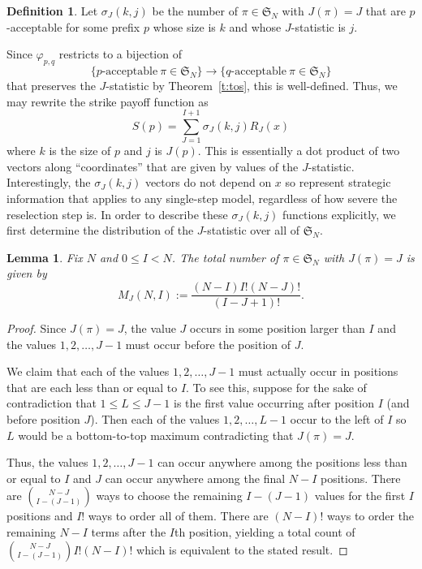 \documentclass[11pt]{amsart}   %
\newtheorem{lemma}[theorem]{Lemma}
\theoremstyle{definition}
\newtheorem{definition}[theorem]{Definition}
\theoremstyle{remark}
\numberwithin{equation}{section}
\theoremstyle{theorem}
\newcommand{\SN}{\mathfrak{S}}
\begin{document}
\begin{definition}
Let $\sigma_J(k, j)$ be the number of $\pi \in \SN_N$ with $J(\pi) = J$ that are $p$-acceptable for some prefix $p$ whose size is $k$ and whose $J$-statistic is $j$.
\end{definition}

Since $\varphi_{p,q}$ restricts to a bijection of
\[ \{p\text{-acceptable}\ \pi \in \SN_N\} \rightarrow \{q\text{-acceptable}\ \pi \in \SN_N\} \] 
that preserves the $J$-statistic by Theorem~\ref{t:tos}, this is well-defined.
Thus, we may rewrite the strike payoff function as
\[ S(p) = \sum_{J=1}^{I+1} \sigma_J(k, j) R_J(x) \]
where $k$ is the size of $p$ and $j$ is $J(p)$.  This is essentially a dot
product of two vectors along ``coordinates'' that are given by values of the
$J$-statistic.  Interestingly, the $\sigma_J(k, j)$ vectors do not depend on $x$
so represent strategic information that applies to any single-step model,
regardless of how severe the reselection step is.  In order to describe these
$\sigma_J(k, j)$ functions explicitly, we first determine the distribution of the
$J$-statistic over all of $\SN_N$.

\begin{lemma}\label{l:mj}
Fix $N$ and $0 \leq I < N$.  The total number of $\pi \in \SN_N$ with $J(\pi) = J$ is given by 
\[ M_J(N, I) := \frac{(N-I) I! (N-J)!}{(I-J+1)!}. \]
\end{lemma}
\begin{proof}
Since $J(\pi) = J$, the value $J$ occurs in some position larger than $I$ and
the values $1, 2, \ldots, J-1$ must occur before the position of $J$.  

We claim that each of the values $1, 2, \ldots, J-1$ must actually occur in
positions that are each less than or equal to $I$.  To see this, suppose for
the sake of contradiction that $1 \leq L \leq J-1$ is the first value occurring
after position $I$ (and before position $J$).  Then each of the values $1, 2,
\ldots, L-1$ occur to the left of $I$ so $L$ would be a bottom-to-top maximum
contradicting that $J(\pi) = J$.  

Thus, the values $1, 2, \ldots, J-1$ can occur anywhere among the positions
less than or equal to $I$ and $J$ can occur anywhere among the final $N-I$
positions.  There are $\binom{N-J}{I-(J-1)}$ ways to choose the remaining
$I-(J-1)$ values for the first $I$ positions and $I!$ ways to order all of
them.  There are $(N-I)!$ ways to order the remaining $N-I$ terms after the
$I$th position, yielding a total count of $\binom{N-J}{I-(J-1)} I! (N-I)!$
which is equivalent to the stated result.
\end{proof}
\end{document}
